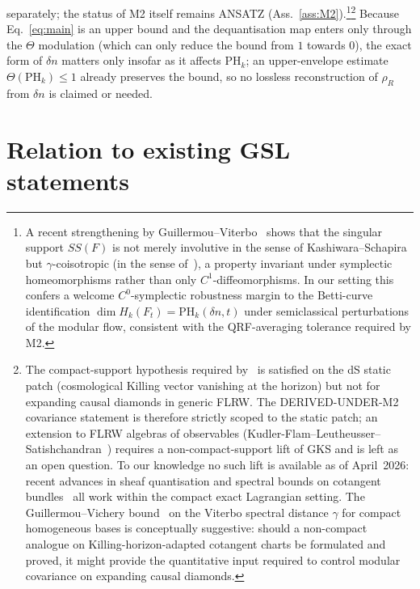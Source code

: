 \documentclass[aps,prd,superscriptaddress,nofootinbib,floatfix,10pt]{revtex4-2}
\theoremstyle{remark}
\newcommand{\PHk}{\mathrm{PH}_{k}}
\newcommand{\dn}{\delta n}
\begin{document}
separately; the status of M2 itself remains ANSATZ
(Ass.~\ref{ass:M2}).\footnote{A recent strengthening by
Guillermou--Viterbo~\cite{GuillermouViterbo2024} shows that the singular
support $SS(F)$ is not merely involutive in the sense of
Kashiwara--Schapira but $\gamma$-coisotropic (in the sense
of~\cite{Viterbo2022supports}), a property invariant under symplectic
homeomorphisms rather than only $C^{1}$-diffeomorphisms. In our setting
this confers a welcome $C^{0}$-symplectic robustness margin to the
Betti-curve identification $\dim H_{k}(F_{t})=\mathrm{PH}_{k}(\dn,t)$
under semiclassical perturbations of the modular flow, consistent with
the QRF-averaging tolerance required by M2.}\footnote{The
compact-support hypothesis required
by~\cite{GuillermouKashiwaraSchapira2012} is satisfied on the dS
static patch (cosmological Killing vector vanishing at the horizon)
but not for expanding causal diamonds in generic FLRW. The
DERIVED-UNDER-M2 covariance statement is therefore strictly scoped
to the static patch; an extension to FLRW algebras of observables
(Kudler-Flam--Leutheusser--Satishchandran~\cite{KFLS2024})
requires a non-compact-support lift of GKS and is left as an open
question. To our knowledge no such lift is available as of April~2026:
recent advances in sheaf quantisation and spectral bounds on cotangent
bundles~\cite{AbouzaidCourteGuillermouKragh2025,GuillermouVichery2022,GuillermouViterbo2024}
all work within the compact exact Lagrangian setting. The
Guillermou--Vichery bound~\cite{GuillermouVichery2022} on the
Viterbo spectral distance $\gamma$ for compact homogeneous bases is
conceptually suggestive: should a non-compact analogue on
Killing-horizon-adapted cotangent charts be formulated and proved, it
might provide the quantitative input required to control modular
covariance on expanding causal diamonds.} Because
Eq.~\eqref{eq:main} is an upper bound and the dequantisation map enters
only through the $\Theta$ modulation (which can only reduce the bound
from $1$ towards $0$), the exact form of $\dn$ matters only insofar as
it affects $\PHk$; an upper-envelope estimate $\Theta(\PHk) \le 1$
already preserves the bound, so no lossless reconstruction of
$\rho_{R}$ from $\dn$ is claimed or needed.

\section{Relation to existing GSL statements}
\label{sec:relation}
\end{document}
